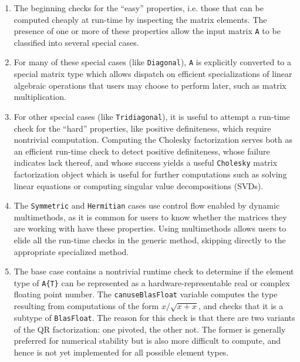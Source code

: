 \documentclass[10pt, preprint]{sigplanconf}
\begin{document}
\begin{enumerate}
\item The beginning checks for the ``easy'' properties, i.e.  those that can be
	computed cheaply at run-time by inspecting the matrix elements. The
	presence of one or more of these properties allow the input matrix
	\verb|A| to be classified into several special cases.

\item For many of these special cases (like \verb|Diagonal|), \verb|A| is
	explicitly converted to a special matrix type which allows dispatch on
	efficient specializations of linear algebraic operations that users may
	choose to perform later, such as matrix multiplication.

\item For other special cases (like \verb|Tridiagonal|), it is useful to
	attempt a run-time check for the ``hard'' properties, like positive
	definiteness, which require nontrivial computation. Computing the
	Cholesky factorization serves both as an efficient run-time check to
	detect positive definiteness, whose failure indicates lack thereof, and
	whose success yields a useful \verb|Cholesky| matrix factorization
	object which is useful for further computations such as solving linear
	equations or computing singular value decompositions (SVDs).

\item The \verb|Symmetric| and \verb|Hermitian| cases use control flow
	enabled by dynamic multimethods, as it is common for users to know
	whether the matrices they are working with have these properties.
	Using multimethods allows users to elide all the run-time checks
	in the generic method, skipping directly to the appropriate specialized
	method.

\item The base case contains a nontrivial runtime check to determine if the
	element type of \verb|A{T}| can be represented as a
	hardware-representable real or complex floating point number. The
	\verb|canuseBlasFloat| variable computes the type resulting from
	computations of the form $x / \sqrt{x + x}$, and checks that it is a
	subtype of \verb|BlasFloat|. The reason for this check is that there
	are two variants of the QR factorization: one pivoted, the other not.
	The former is generally preferred for numerical stability but is also
	more difficult to compute, and hence is not yet
	implemented for all possible element types.

\end{enumerate}
\end{document}
